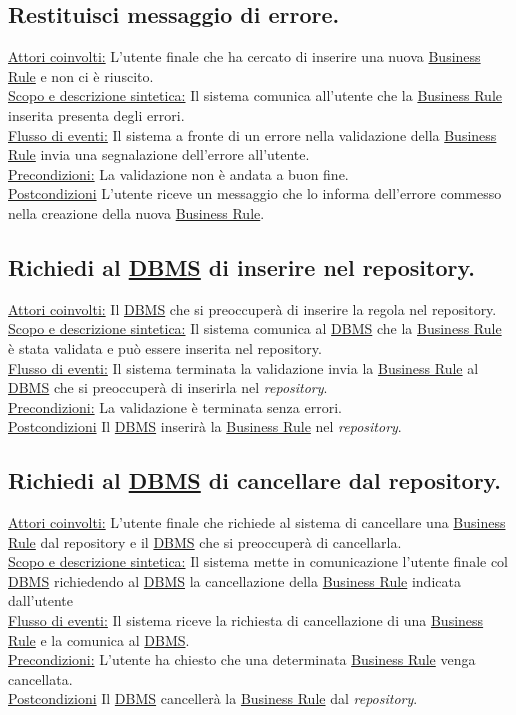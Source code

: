 \subsection{Restituisci messaggio di errore.}
\underline{Attori coinvolti:} L'utente finale che ha cercato di inserire una nuova \underline{Business Rule} e non ci \`e riuscito.\\
\underline{Scopo e descrizione sintetica:} Il sistema comunica all'utente che la \underline{Business Rule} inserita presenta degli errori.\\
\underline{Flusso di eventi:} Il sistema  a fronte di un errore nella validazione della \underline{Business Rule} invia una segnalazione dell'errore all'utente.\\
\underline{Precondizioni:} La validazione non \`e andata a buon fine.\\
\underline{Postcondizioni} L'utente riceve un messaggio che lo informa dell'errore commesso nella creazione della nuova \underline{Business Rule}.

\subsection{Richiedi al \underline{DBMS} di inserire nel repository.}
\underline{Attori coinvolti:} Il \underline{DBMS} che si preoccuper\`a di inserire la regola nel repository.\\
\underline{Scopo e descrizione sintetica:} Il sistema comunica al \underline{DBMS} che la \underline{Business Rule} \`e stata validata e pu\`o essere inserita nel repository.\\
\underline{Flusso di eventi:} Il sistema  terminata la validazione invia la \underline{Business Rule} al \underline{DBMS} che si preoccuper\`a di inserirla nel \textit{repository}.\\
\underline{Precondizioni:} La validazione \`e terminata senza errori.\\
\underline{Postcondizioni} Il \underline{DBMS} inserir\`a la \underline{Business Rule} nel \textit{repository}.

\subsection{Richiedi al \underline{DBMS} di cancellare dal repository.}
\underline{Attori coinvolti:} L'utente finale che richiede al sistema di cancellare una \underline{Business Rule} dal repository e il \underline{DBMS} che si preoccuper\`a di cancellarla.\\
\underline{Scopo e descrizione sintetica:} Il sistema mette in comunicazione l'utente finale col \underline{DBMS} richiedendo al \underline{DBMS} la cancellazione della \underline{Business Rule} indicata dall'utente\\
\underline{Flusso di eventi:} Il sistema riceve la richiesta di cancellazione di una \underline{Business Rule} e la comunica al \underline{DBMS}.\\
\underline{Precondizioni:} L'utente ha chiesto che una determinata \underline{Business Rule} venga cancellata.\\
\underline{Postcondizioni} Il \underline{DBMS} canceller\`a la \underline{Business Rule} dal \textit{repository}.



